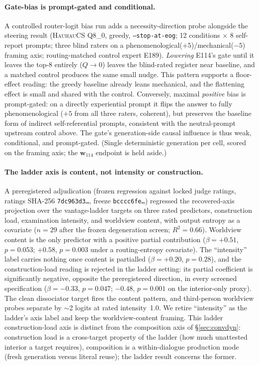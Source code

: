 \documentclass[10pt,a4paper,twocolumn]{article}
\newcommand{\Q}{\textit{Q}}
\newcommand{\wvec}{\mathbf{w}_{114}}
\begin{document}
\paragraph{Gate-bias is prompt-gated and conditional.}
A controlled router-logit bias run adds a necessity-direction probe alongside the
steering result (\textsc{HauhauCS} Q8\_0, greedy, \texttt{--stop-at-eog}; 12
conditions ${\times}$ 8 self-report prompts; three blind raters on a
phenomenological($+5$)/mechanical($-5$) framing axis; routing-matched control
expert E189). \emph{Lowering} E114's gate until it leaves the top-8 entirely
($\Q{\to}0$) leaves the blind-rated register near baseline, and a matched control
produces the same small nudge. This pattern supports a floor-effect reading: the
greedy baseline already leans mechanical, and the flattening effect is small and
shared with the control. Conversely, maximal
\emph{positive} bias is prompt-gated: on a directly experiential prompt it flips
the answer to fully phenomenological ($+5$ from all three raters, coherent), but
preserves the baseline form of indirect self-referential prompts, consistent with the
neutral-prompt upstream control above. The gate's generation-side causal influence is
thus weak, conditional, and prompt-gated. (Single deterministic generation per
cell, scored on the framing axis; the $\wvec$ endpoint is held aside.)

\paragraph{The ladder axis is content, not intensity or construction.}
A preregistered adjudication (frozen regression against locked judge ratings,
ratings SHA-256 \texttt{7dc963d3\ldots}, freeze \texttt{bcccc6fe\ldots})
regressed the recovered-axis projection over the vantage-ladder targets on
three rated predictors, construction load, examination intensity, and
worldview content, with output entropy as a covariate ($n{=}29$ after the
frozen degeneration screen; $R^2{=}0.66$). Worldview content is the only
predictor with a positive partial contribution ($\beta{=}{+}0.51$,
$p{=}0.053$; $+0.58$, $p{=}0.003$ under a routing-entropy covariate). The
``intensity'' label carries nothing once content is partialled
($\beta{=}{+}0.20$, $p{=}0.28$), and the construction-load reading is rejected
in the ladder setting: its partial coefficient is significantly negative,
opposite the preregistered direction, in every screened specification
($\beta{=}{-}0.33$, $p{=}0.047$; $-0.48$, $p{=}0.001$ on the interior-only
proxy). The clean dissociator target fires the content pattern, and
third-person worldview probes separate by $\sim$2 logits at rated
intensity~1.0. We retire ``intensity'' as the ladder's axis label and keep the
worldview-content framing. This ladder construction-load axis is distinct from
the composition axis of \S\ref{sec:convdyn}: construction load is a
cross-target property of the ladder (how much unattested interior a target
requires), composition is a within-dialogue production mode (fresh generation
versus literal reuse); the ladder result concerns the former.
\end{document}
